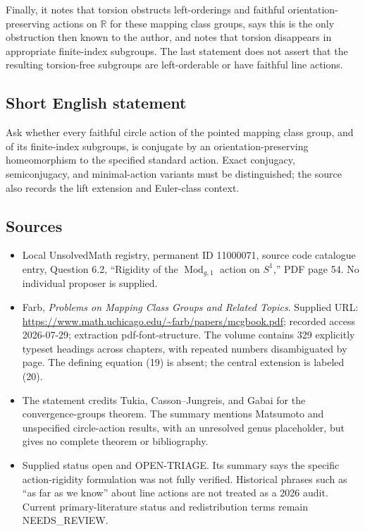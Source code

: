 \documentclass[11pt]{article}
\newcommand{\R}{\mathbb{R}}
\begin{document}
Finally, it notes that torsion obstructs left-orderings and faithful orientation-preserving actions on \(\R\) for these mapping class groups, says this is the only obstruction then known to the author, and notes that torsion disappears in appropriate finite-index subgroups. The last statement does not assert that the resulting torsion-free subgroups are left-orderable or have faithful line actions.
\subsection{Short English statement}
Ask whether every faithful circle action of the pointed mapping class group, and of its finite-index subgroups, is conjugate by an orientation-preserving homeomorphism to the specified standard action. Exact conjugacy, semiconjugacy, and minimal-action variants must be distinguished; the source also records the lift extension and Euler-class context.
\subsection{Sources}
\begin{itemize}
\item Local UnsolvedMath registry, permanent ID 11000071, source code catalogue entry, Question 6.2, ``Rigidity of the \(\operatorname{Mod}_{g,1}\) action on \(S^1\),'' PDF page 54. No individual proposer is supplied.
\item Farb, \emph{Problems on Mapping Class Groups and Related Topics}. Supplied URL: \url{https://www.math.uchicago.edu/~farb/papers/mcgbook.pdf}; recorded access 2026-07-29; extraction pdf-font-structure. The volume contains 329 explicitly typeset headings across chapters, with repeated numbers disambiguated by page. The defining equation (19) is absent; the central extension is labeled (20).
\item The statement credits Tukia, Casson--Jungreis, and Gabai for the convergence-groups theorem. The summary mentions Matsumoto and unspecified circle-action results, with an unresolved genus placeholder, but gives no complete theorem or bibliography.
\item Supplied status open and OPEN-TRIAGE. Its summary says the specific action-rigidity formulation was not fully verified. Historical phrases such as ``as far as we know'' about line actions are not treated as a 2026 audit. Current primary-literature status and redistribution terms remain NEEDS\_REVIEW.
\end{itemize}
\end{document}
